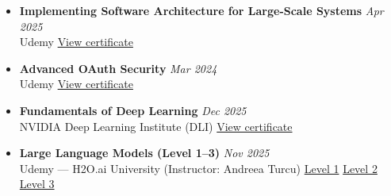 \begin{itemize}[leftmargin=*, itemsep=0.35em]

  \item
  \noindent\textbf{Implementing Software Architecture for Large-Scale Systems}%
  \hfill\textit{Apr 2025}\\[-0.15em]
  {\footnotesize
    Udemy%
    \hfill\href{https://www.udemy.com/certificate/UC-2a562ca8-a9e3-4ee0-b2c3-e7a432ac4529/}{View certificate}
  }
  
  \item
  \noindent\textbf{Advanced OAuth Security}%
  \hfill\textit{Mar 2024}\\[-0.15em]
  {\footnotesize
    Udemy%
    \hfill\href{https://www.udemy.com/certificate/UC-57aa3ba1-44be-4d7d-ab4b-e232f489411d/}{View certificate}
  }


\item
\noindent\textbf{Fundamentals of Deep Learning}%
\hfill\textit{Dec 2025}\\[-0.15em]
{\footnotesize
  NVIDIA Deep Learning Institute (DLI)%
  \hfill\href{https://learn.nvidia.com/certificates?id=sBdegKUWTHGek09Ydu52rg}{View certificate}
}


  \item
  \noindent\textbf{Large Language Models (Level 1–3)}%
  \hfill\textit{Nov 2025}\\[-0.15em]
  {\footnotesize
    Udemy --- H2O.ai University (Instructor: Andreea Turcu)%
    \hfill
    \href{https://www.udemy.com/certificate/UC-31b33332-e280-4009-828e-1186b2320d6a/}{Level 1} \textbar{}
    \href{https://www.udemy.com/certificate/UC-e411b75f-d04c-40f4-bac2-a97ddb3c9d04/}{Level 2} \textbar{}
    \href{https://www.udemy.com/certificate/UC-b9ade739-890e-49ea-8db5-6b34fed71d68/}{Level 3}
  }



\end{itemize}

